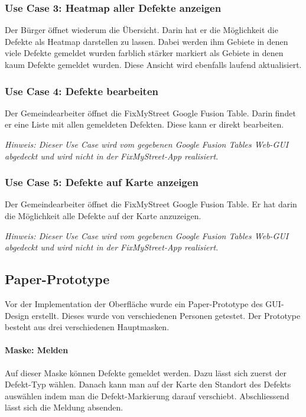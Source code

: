 \subsubsection{Use Case 3: Heatmap aller Defekte anzeigen}
Der Bürger öffnet wiederum die Übersicht. Darin hat er die Möglichkeit die Defekte als Heatmap darstellen zu lassen. Dabei werden ihm Gebiete in denen viele Defekte gemeldet wurden farblich stärker markiert als Gebiete in denen kaum Defekte gemeldet wurden. Diese Ansicht wird ebenfalls laufend aktualisiert. 

\subsubsection{Use Case 4: Defekte bearbeiten}
Der Gemeindearbeiter öffnet die FixMyStreet Google Fusion Table. Darin findet er eine Liste mit allen gemeldeten Defekten. Diese kann er direkt bearbeiten.

\emph{Hinweis: Dieser Use Case wird vom gegebenen Google Fusion Tables Web-GUI abgedeckt und wird nicht in der FixMyStreet-App realisiert.}

\subsubsection{Use Case 5: Defekte auf Karte anzeigen}
Der Gemeindearbeiter öffnet die FixMyStreet Google Fusion Table. Er hat darin die Möglichkeit alle Defekte auf der Karte anzuzeigen.

\emph{Hinweis: Dieser Use Case wird vom gegebenen Google Fusion Tables Web-GUI abgedeckt und wird nicht in der FixMyStreet-App realisiert.}

\subsection{Paper-Prototype}
Vor der Implementation der Oberfläche wurde ein Paper-Prototype des GUI-Design erstellt. Dieses wurde von verschiedenen Personen getestet. Der Prototype besteht aus drei verschiedenen Hauptmasken.

\paragraph{Maske: Melden}
Auf dieser Maske können Defekte gemeldet werden. Dazu lässt sich zuerst der Defekt-Typ wählen. Danach kann man auf der Karte den Standort des Defekts auswählen indem man die Defekt-Markierung darauf verschiebt. Abschliessend lässt sich die Meldung absenden.

